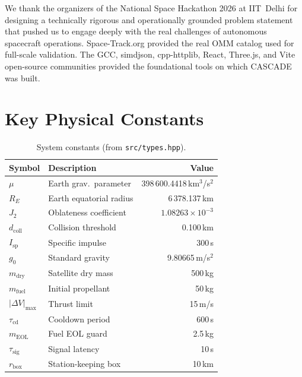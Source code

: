 \documentclass[10pt,twocolumn,letterpaper]{article}
\begin{document}
We thank the organizers of the National Space Hackathon 2026 at IIT~Delhi
for designing a technically rigorous and operationally grounded problem
statement that pushed us to engage deeply with the real challenges of
autonomous spacecraft operations.  Space-Track.org provided the real OMM
catalog used for full-scale validation.  The GCC, simdjson, cpp-httplib,
React, Three.js, and Vite open-source communities provided the
foundational tools on which CASCADE was built.

\appendix

\section{Key Physical Constants}\label{app:constants}

\begin{table}[h]
\centering\small
\begin{tabular}{@{}llr@{}}
\toprule
\textbf{Symbol} & \textbf{Description} & \textbf{Value} \\
\midrule
$\mu$       & Earth grav.\ parameter  & 398\,600.4418\,km$^3$/s$^2$ \\
$R_E$       & Earth equatorial radius  & 6\,378.137\,km \\
$J_2$       & Oblateness coefficient   & $1.08263 \times 10^{-3}$ \\
$d_{\text{coll}}$ & Collision threshold & 0.100\,km \\
$I_{\text{sp}}$ & Specific impulse      & 300\,s \\
$g_0$       & Standard gravity         & 9.80665\,m/s$^2$ \\
$m_{\text{dry}}$ & Satellite dry mass   & 500\,kg \\
$m_{\text{fuel}}$ & Initial propellant  & 50\,kg \\
$|\Delta V|_{\max}$ & Thrust limit     & 15\,m/s \\
$\tau_{\text{cd}}$ & Cooldown period    & 600\,s \\
$m_{\text{EOL}}$ & Fuel EOL guard       & 2.5\,kg \\
$\tau_{\text{sig}}$ & Signal latency    & 10\,s \\
$r_{\text{box}}$ & Station-keeping box  & 10\,km \\
\bottomrule
\end{tabular}
\caption{System constants (from \texttt{src/types.hpp}).}
\label{tab:constants}
\end{table}
\end{document}
